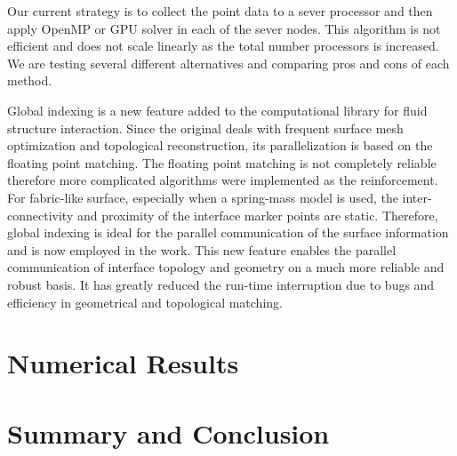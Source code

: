 Our current strategy is to collect the point data to a sever processor and then
apply OpenMP or GPU solver in each of the sever nodes. This algorithm is not
efficient and does not scale linearly as the total number processors is
increased. We are testing several different alternatives and comparing pros and
cons of each method.

Global indexing is a new feature added to the \FronTierp computational library
for fluid structure interaction.  Since the original \FronTierp
\cite{DuFixGli05} deals with frequent surface mesh optimization and topological
reconstruction, its parallelization is based on the floating point matching.
The floating point matching is not completely reliable therefore more
complicated algorithms were implemented as the reinforcement.  For fabric-like
surface, especially when a spring-mass model is used, the inter-connectivity and
proximity of the interface marker points are static. Therefore, global indexing
is ideal for the parallel communication of the surface information and is now
employed in the work.  This new feature enables the parallel communication of
interface topology and geometry on a much more reliable and robust basis. It has
greatly reduced the run-time interruption due to bugs and efficiency in
geometrical and topological matching.

\section{Numerical Results}

\section{Summary and Conclusion}

